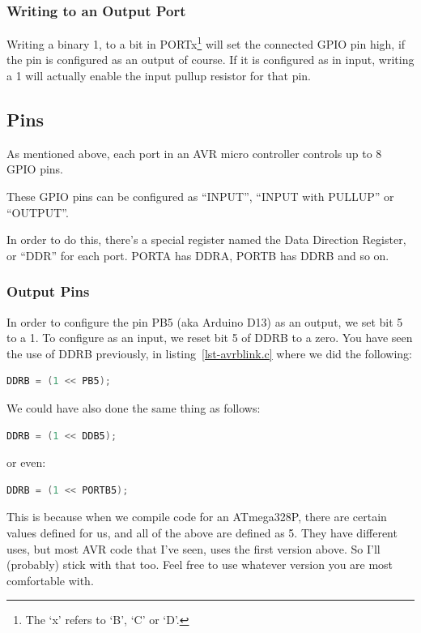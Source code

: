 \subsubsection{Writing to an Output Port}\label{avr-ports-output-writing}
Writing a binary 1, to a bit in PORTx\footnote{The `x' refers to `B', `C' or `D'.} will set the connected GPIO pin high, if the pin is configured as an output of course. If it is configured as in input, writing a 1 will actually enable the input pullup resistor for  that pin.

\subsection{Pins}\label{avr-pins}

As mentioned above, each port in an AVR micro controller controls up to 8 GPIO pins. 

These GPIO pins can be configured as ``INPUT'', ``INPUT with PULLUP'' or ``OUTPUT''. 

In order to do this, there's a special register named the Data Direction Register, or ``DDR'' for each port. PORTA has DDRA, PORTB has DDRB and so on.

\subsubsection{Output Pins}\label{avr-pins-output}
In order to configure the pin PB5 (aka Arduino D13) as an output, we set bit 5 to a 1. To configure as an input, we reset bit 5 of DDRB to a zero. You have seen the use of DDRB previously, in listing~\ref{lst-avrblink.c} where we did the following:

\begin{lstlisting}[language=C,numbers={none}]
	DDRB = (1 << PB5);
\end{lstlisting}

We could have also done the same thing as follows:

\begin{lstlisting}[language=C,numbers={none}]
	DDRB = (1 << DDB5);
\end{lstlisting}

or even:

\begin{lstlisting}[language=C,numbers={none}]
	DDRB = (1 << PORTB5);
\end{lstlisting}

This is because when we compile code for an ATmega328P, there are certain values defined for us, and all of the above are defined as 5. They have different uses, but most AVR code that I've seen, uses the first version above. So I'll (probably) stick with that too. Feel free to use whatever version you are most comfortable with.

